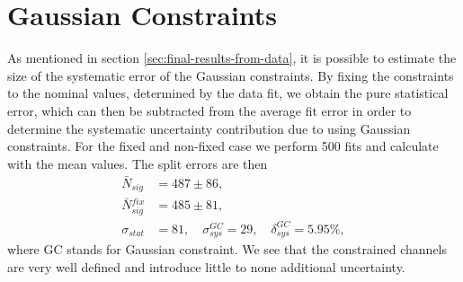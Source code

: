 \section{Gaussian Constraints}
As mentioned in section \ref{sec:final-results-from-data}, it is possible to estimate the size of the systematic error of the Gaussian constraints. By fixing the constraints to the nominal values, determined by the data fit, we obtain the pure statistical error, which can then be subtracted from the average fit error in order to determine the systematic uncertainty contribution due to using Gaussian constraints. For the fixed and non-fixed case we perform 500 fits and calculate with the mean values. The split errors are then
\begin{align}
\bar N {}_{sig} &= 487 \pm 86, \\
\bar N {}_{sig}^{fix} &= 485 \pm 81, \\
\sigma_{stat} &= 81,\quad \sigma_{sys}^{GC} = 29,\quad \delta_{sys}^{GC} = 5.95\%,
\end{align}
where GC stands for Gaussian constraint. We see that the constrained channels are very well defined and introduce little to none additional uncertainty.


